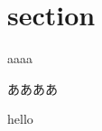 \documentclass[a4paper]{jsarticle}
\begin{document}
\section{section}
aaaa

ああああ

hello



\MT
\end{document}
